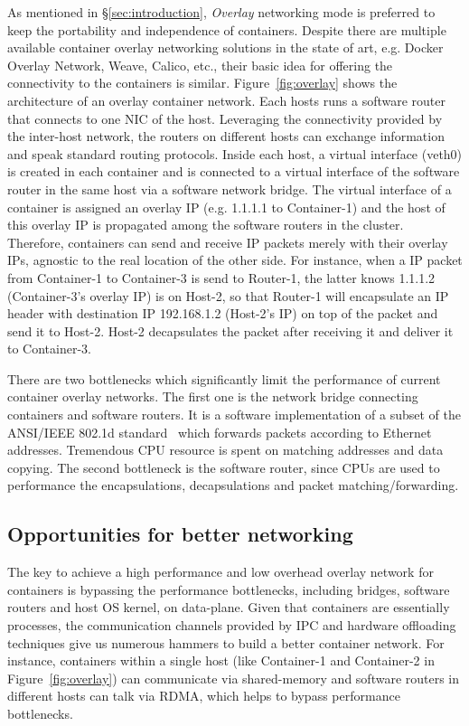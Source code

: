 As mentioned in \S\ref{sec:introduction}, {\em Overlay} networking mode 
is preferred to keep the portability and independence of containers.
Despite there are multiple available container overlay networking solutions
in the state of art, e.g. Docker Overlay Network, Weave, Calico, etc., 
their basic idea for offering the connectivity to the containers is similar.
Figure~\ref{fig:overlay} shows the architecture of an overlay container network.
Each hosts runs a software router that connects to one NIC of the host. 
Leveraging the connectivity provided by the inter-host network, the routers
on different hosts can exchange information and speak standard routing protocols.
Inside each host, a virtual interface (veth0) is created in each container and is connected to a virtual interface of the software router in the same host via a software network bridge. The virtual interface of a container is assigned
an overlay IP (e.g. 1.1.1.1 to Container-1) and the host of this overlay IP
is propagated among the software routers in the cluster. Therefore, containers
can send and receive IP packets merely with their overlay IPs, agnostic to
the real location of the other side. For instance, when a IP packet from
Container-1 to Container-3 is send to Router-1, the latter knows 1.1.1.2
(Container-3's overlay IP) is on Host-2, so that Router-1 will encapsulate 
an IP header with destination IP 192.168.1.2 (Host-2's IP) on top of the packet
and send it to Host-2. Host-2 decapsulates the packet after receiving it
and deliver it to Container-3.  

There are two bottlenecks which significantly limit the performance
of current container overlay networks. The first one is the network bridge
connecting containers and software routers. It is a software implementation
of a subset of the ANSI/IEEE 802.1d standard~\cite{?} which forwards packets
according to Ethernet addresses. Tremendous CPU resource is spent on matching
addresses and data copying. The second bottleneck is the software router, since
CPUs are used to performance the encapsulations, decapsulations and packet matching/forwarding.


\subsection{Opportunities for better networking}

The key to achieve a high performance and low overhead overlay network
for containers is bypassing the performance bottlenecks, including
bridges, software routers and host OS kernel, on data-plane. Given that
containers are essentially processes, the communication channels provided
by IPC and hardware offloading techniques give us numerous hammers to 
build a better container network. For instance, 
containers within a single host (like Container-1 and 
Container-2 in Figure~\ref{fig:overlay}) can communicate via 
shared-memory and software routers in different hosts can talk via RDMA, 
which helps to bypass performance bottlenecks.


